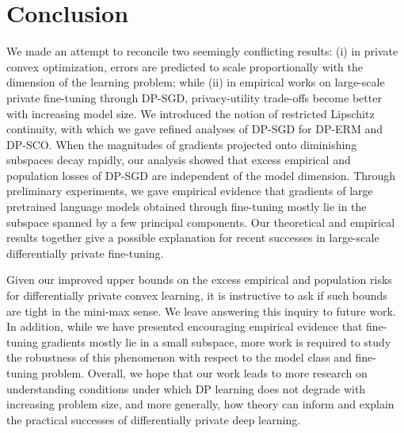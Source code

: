 \section{Conclusion}
We made an attempt to reconcile two seemingly conflicting results: (i) in private convex optimization, errors are predicted to scale proportionally with the dimension of the learning problem; while (ii) in empirical works on large-scale private fine-tuning through DP-SGD, privacy-utility trade-offs become better with increasing model size.
We introduced the notion of restricted Lipschitz continuity, with which we gave refined analyses of DP-SGD for DP-ERM and DP-SCO. 
When the magnitudes of gradients projected onto diminishing subspaces decay rapidly, our analysis showed that excess empirical and population losses of DP-SGD are independent of the model dimension. 
Through preliminary experiments, we gave empirical evidence that gradients of large pretrained language models obtained through fine-tuning mostly lie in the subspace spanned by a few principal components. 
Our theoretical and empirical results together give a possible explanation for recent successes in large-scale differentially private fine-tuning.

Given our improved upper bounds on the excess empirical and population risks for differentially private convex learning, it is instructive to ask if such bounds are tight in the mini-max sense.
We leave answering this inquiry to future work.
In addition, while we have presented encouraging empirical evidence that fine-tuning gradients mostly lie in a small subspace, more work is required to study the robustness of this phenomenon with respect to the model class and fine-tuning problem.
Overall, we hope that our work leads to more research on understanding conditions under which DP learning does not degrade with increasing problem size, and more generally, how theory can inform and explain the practical successes of differentially private deep learning.

